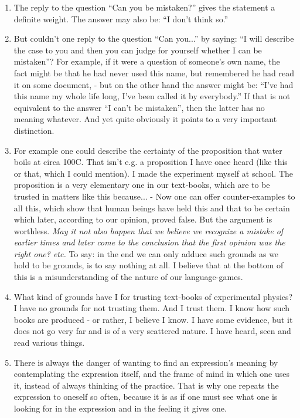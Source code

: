 \documentclass{book}
\begin{document}
\begin{enumerate}
\item
The reply to the question ``Can you be mistaken?'' gives the statement a
definite weight. The answer may also be: ``I don't think so.''

\item
But couldn't one reply to the question ``Can you...'' by saying: ``I will
describe the case to you and then you can judge for yourself whether I can be
mistaken''?  For example, if it were a question of someone's own name, the fact
might be that he had never used this name, but remembered he had read it on
some document, - but on the other hand the answer might be: ``I've had this
name my whole life long, I've been called it by everybody.'' If that is not
equivalent to the answer ``I can't be mistaken'', then the latter has no
meaning whatever. And yet quite obviously it points to a very important
distinction.

\item
For example one could describe the certainty of the proposition that water
boils at circa 100C. That isn't e.g. a proposition I have once heard (like this
or that, which I could mention). I made the experiment myself at school. The
proposition is a very elementary one in our text-books, which are to be trusted
in matters like this because... - Now one can offer counter-examples to all
this, which show that human beings have held this and that to be certain which
later, according to our opinion, proved false. But the argument is worthless.
\emph{May it not also happen that we believe we recognize a mistake of earlier
times and later come to the conclusion that the first opinion was the right
one? etc.} To say: in the end we can only adduce such grounds as we hold to be
grounds, is to say nothing at all.  I believe that at the bottom of this is a
misunderstanding of the nature of our language-games.

\item
What kind of grounds have I for trusting text-books of experimental physics?  I
have no grounds for not trusting them. And I trust them. I know how such books
are produced - or rather, I believe I know. I have some evidence, but it does
not go very far and is of a very scattered nature. I have heard, seen and read
various things.

\item
There is always the danger of wanting to find an expression's meaning by
contemplating the expression itself, and the frame of mind in which one uses
it, instead of always thinking of the practice. That is why one repeats the
expression to oneself so often, because it is as if one must see what one is
looking for in the expression and in the feeling it gives one.


\end{enumerate}
\end{document}
